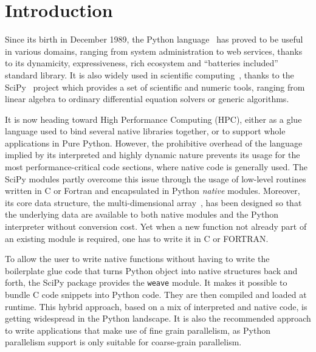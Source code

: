 \documentclass[conference]{IEEEtran}
\begin{document}
%
\section{Introduction}

Since its birth in December 1989, the Python language~\cite{rossum97} has proved
to be useful in various domains, ranging from system administration to web
services, thanks to its dynamicity, expressiveness, rich ecosystem and
``batteries included'' standard library. It is also widely used in scientific
computing~\cite{Oliphant2007}, thanks to the SciPy~\cite{scipy} project
which provides a set of scientific and numeric tools, ranging from linear
algebra to ordinary differential equation solvers or generic algorithms.

It is now heading toward High Performance Computing (HPC), either as a glue
language used to bind several native libraries together, or to support whole
applications in Pure Python. However, the prohibitive overhead of the language
implied by its interpreted and highly dynamic nature prevents its usage for the
most performance-critical code sections, where native code is generally used.
The SciPy modules partly overcome this issue through the usage of low-level
routines written in C or Fortran and encapsulated in Python \emph{native}
modules. Moreover, its core data structure, the multi-dimensional
array~\cite{numpyarray2011}, has been designed so that the underlying data are
available to both native modules and the Python interpreter without conversion
cost. Yet when a new function not already part of an existing module is
required, one has to write it in C or FORTRAN.

To allow the user to write native functions without having to write the
boilerplate glue code that turns Python object into native structures back and
forth, the SciPy package provides the \texttt{weave} module. It makes it
possible to bundle C code snippets into Python code. They are then compiled and
loaded at runtime. This hybrid approach, based on a mix of interpreted and
native code, is getting widespread in the Python landscape. It is also the
recommended approach to write applications that make use of fine grain
parallelism, as Python parallelism support is only suitable for coarse-grain
parallelism.
\end{document}
